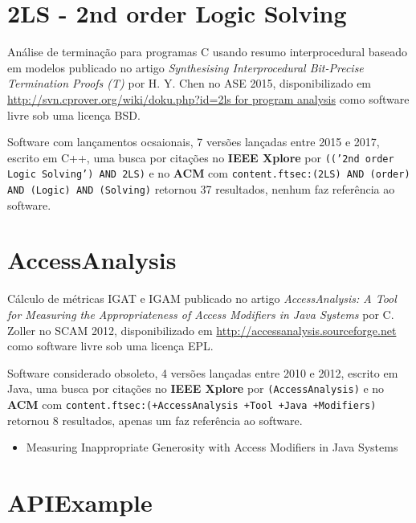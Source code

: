 

\label{softwares-summary}

\section{2LS - 2nd order Logic Solving}

Análise de terminação para programas C usando resumo interprocedural baseado em modelos
publicado no artigo {\it Synthesising Interprocedural Bit-Precise Termination Proofs (T)}
por H. Y. Chen
no ASE 2015,
disponibilizado em \url{http://svn.cprover.org/wiki/doku.php?id=2ls for program analysis}
como software livre
sob uma licença BSD.

Software com lançamentos ocsaionais,
7 versões lançadas
entre 2015 e 2017,
escrito em C++,
uma busca por citações no {\bf IEEE Xplore} por
\texttt{(('2nd order Logic Solving') AND 2LS)}
e no {\bf ACM} com
\texttt{content.ftsec:(2LS) AND (order) AND (Logic) AND (Solving)}
retornou
37 resultados,
nenhum faz referência ao software.


\section{AccessAnalysis}

Cálculo de métricas IGAT e IGAM
publicado no artigo {\it AccessAnalysis: A Tool for Measuring the Appropriateness of Access Modifiers in Java Systems}
por C. Zoller
no SCAM 2012,
disponibilizado em \url{http://accessanalysis.sourceforge.net}
como software livre
sob uma licença EPL.

Software considerado obsoleto,
4 versões lançadas
entre 2010 e 2012,
escrito em Java,
uma busca por citações no {\bf IEEE Xplore} por
\texttt{(AccessAnalysis)}
e no {\bf ACM} com
\texttt{content.ftsec:(+AccessAnalysis +Tool +Java +Modifiers)}
retornou
8 resultados,
apenas um faz referência ao software.

\begin{itemize}
\item Measuring Inappropriate Generosity with Access Modifiers in Java Systems
\end{itemize}

\section{APIExample}

